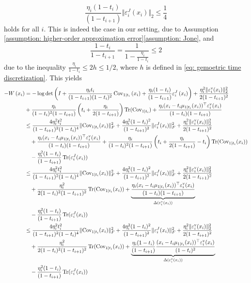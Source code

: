\documentclass{article}
\theoremstyle{plain}
\theoremstyle{definition}
\theoremstyle{remark}
\def\Norm#1{\Vert#1\Vert}
\def\Cov{\text{Cov}}
\DeclareMathOperator{\Tr}{Tr}
\begin{document}
$$\frac{\eta_i (1-t_i)}{(1-t_{i+1})} \Norm{\varepsilon_i^J(x_i)}_2\le \frac{1}{4}
$$
holds for all $i$. This is indeed the case in our setting, due to Assumption \ref{assumption: higher-order approximation error}\ref{assumption: Jone},  and 
$$\frac{1-t_i}{1 - t_{i+1}} = \frac{1}{1 - \frac{\eta_i}{1 - t_i}} \le 2$$
due to the inequality $\frac{\eta_i}{1 - t_i} \le 2h \le 1/2$, where $h$ is defined in \eqref{eq: gemoetric time discretization}.
This yields 
\begin{equation}
\label{eq: bound on W}
\begin{aligned}
- W\left(x_{i}\right) & = - \log \operatorname{det}\left( I+ \frac{\eta_i t_i}{(1-t_{i+1}) (1-t_i)^2} \operatorname{Cov}_{1 \mid t_i}\left(x_{i}\right)
+ \frac{\eta_i(1-t_i)}{(1-t_{i+1})} \varepsilon_i^{J}\left(x_{i}\right)\right)
+  \frac{\eta_i^2 \Norm{\varepsilon_i^{\rm v}(x_i)}_2^2}{2(1-t_{i+1})^2} \\
& + \frac{\eta_i}{(1-t_i)^2 (1-t_{i+1})} \left(t_i + \frac{\eta_i}{2(1-t_{i+1})}\right) \Tr(\Cov_{1\mid t_i})
+
\frac{\eta_i (x_i - t_i \mu_{1\mid t_i}(x_i))^\top \varepsilon_i^{\rm v}(x_i)}{(1-t_i)(1-t_{i+1})}\\
& \le \frac{4 \eta_i^2 t_i^2}{(1-t_{i+1})^2 (1-t_i)^4} \Norm{\Cov_{1 \mid t_i}(x_i)}_F^2 + \frac{4 \eta_i^2 (1-t_i)^2}{(1-t_{i+1})^2} \Norm{\varepsilon_i^J(x_i)}_F^2 + \frac{\eta_i^2 \Norm{\varepsilon_i^{\rm v}(x_i)}_2^2}{2(1-t_{i+1})^2} \\
& \quad + \frac{\eta_i (x_i - t_i \mu_{1\mid t_i}(x_i))^\top \varepsilon_i^{\rm v}(x_i)}{(1-t_i)(1-t_{i+1})} +  \frac{\eta_i}{(1-t_i)^2 (1-t_{i+1})} \left(t_i + \frac{\eta_i}{2(1-t_{i+1})} -  t_i\right) \Tr(\Cov_{1\mid t_i}(x_i) )\\
& \quad - \frac{\eta_i^2 (1-t_i)}{(1-t_{i+1})} \Tr(\varepsilon_i^J(x_i))\\
& \le \frac{4 \eta_i^2 t_i^2}{(1-t_{i+1})^2 (1-t_i)^4} \Norm{\Cov_{1 \mid t_i}(x_i)}_F^2 + \frac{4 \eta_i^2 (1-t_i)^2}{(1-t_{i+1})^2} \Norm{\varepsilon_i^J(x_i)}_F^2 + \frac{\eta_i^2 \Norm{\varepsilon_i^{\rm v}(x_i)}_2^2}{2(1-t_{i+1})^2} \\
& \quad  +  \frac{\eta_i^2}{2(1-t_i)^2 (1-t_{i+1})^2} \Tr(\Cov_{1\mid t_i}(x_i) ) + \underbrace{\frac{\eta_i (x_i - t_i \mu_{1\mid t_i}(x_i))^\top \varepsilon_i^{\rm v}(x_i)}{(1-t_i)(1-t_{i+1})}}_{\Delta(\varepsilon_i^{\rm v}(x_i))}\\
& \quad - \frac{\eta_i^2 (1-t_i)}{(1-t_{i+1})} \Tr(\varepsilon_i^J(x_i))\\
& 
\le \frac{4 \eta_i^2 t_i^2}{(1-t_{i+1})^2 (1-t_i)^4} \Norm{\Cov_{1 \mid t_i}(x_i)}_F^2 + \frac{4 \eta_i^2 (1-t_i)^2}{(1-t_{i+1})^2} \Norm{\varepsilon_i^J(x_i)}_F^2 + \frac{\eta_i^2 \Norm{\varepsilon_i^{\rm v}(x_i)}_2^2}{2(1-t_{i+1})^2} \\
& \quad  +  \frac{\eta_i^2}{2(1-t_i)^2 (1-t_{i+1})^2} \Tr(\Cov_{1\mid t_i}(x_i) ) + \underbrace{\frac{\eta_i (1-t_i)}{(1-t_{i+1})}\frac{(x_i - t_i \mu_{1\mid t_i}(x_i))^\top \varepsilon_i^{\rm v}(x_i)}{(1-t_i)^2}}_{\Delta(\varepsilon_i^{\rm v}(x_i))}\\
& \quad - \frac{\eta_i^2 (1-t_i)}{(1-t_{i+1})} \Tr(\varepsilon_i^J(x_i))
\end{aligned}
\end{equation}
\end{document}
